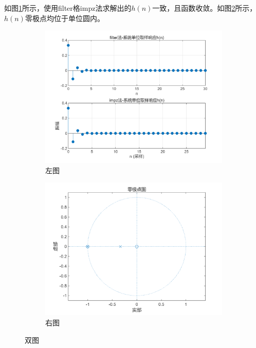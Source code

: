 \documentclass{cquptformat}
\begin{document}
如图\ref{fig:L1}所示，使用filter格impz法求解出的$h(n)$一致，且函数收敛。如图\ref{fig:R1}所示，$h(n)$零极点均位于单位圆内。
\begin{figure}[ht]
	\centering
	\begin{subfigure}[ht]{0.49\textwidth}
		\centering
		\includegraphics[width=\linewidth]{figures/figure_0.png}
		\caption{左图}
		\label{fig:L1}
	\end{subfigure}
	\hspace{2pt}
	\begin{subfigure}[ht]{0.49\textwidth}
		\centering
		\includegraphics[width=\linewidth]{figures/figure_1.png}
		\caption{右图}
		\label{fig:R1}
	\end{subfigure}
	\caption{双图}
	\label{fig:双图1}
\end{figure}
\end{document}
